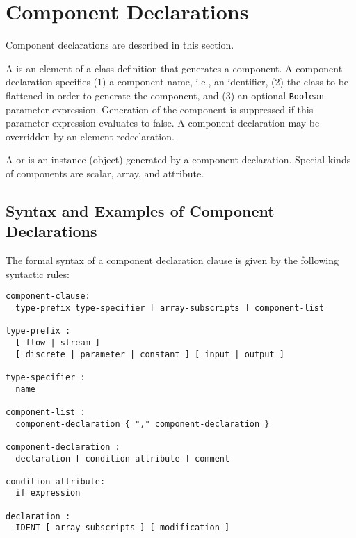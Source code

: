 \section{Component Declarations}\label{component-declarations}

Component declarations are described in this section.

A  is an element of a class definition that generates a component.
A component declaration specifies (1) a component name, i.e., an identifier, (2) the class to be flattened in order to generate the component, and (3) an optional \lstinline!Boolean! parameter expression.
Generation of the component is suppressed if this parameter expression evaluates to false.
A component declaration may be overridden by an element-redeclaration.

A  or  is an instance (object) generated by a component declaration.
Special kinds of components are scalar, array, and attribute.

\subsection{Syntax and Examples of Component Declarations}\label{syntax-and-examples-of-component-declarations}

The formal syntax of a component declaration clause is given by the following syntactic rules:
\begin{lstlisting}[language=grammar]
component-clause:
  type-prefix type-specifier [ array-subscripts ] component-list

type-prefix :
  [ flow | stream ]
  [ discrete | parameter | constant ] [ input | output ]

type-specifier :
  name

component-list :
  component-declaration { "," component-declaration }

component-declaration :
  declaration [ condition-attribute ] comment

condition-attribute:
  if expression

declaration :
  IDENT [ array-subscripts ] [ modification ]
\end{lstlisting}

